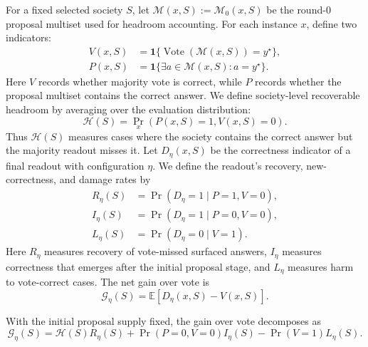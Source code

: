 \documentclass{article}
\begin{document}
For a fixed selected society $S$, let
$\mathcal M(x,S):=\mathcal M_0(x,S)$ be the round-0 proposal multiset used for
headroom accounting. For each instance $x$, define two indicators:
\begin{equation}
\begin{aligned}
    V(x,S)&=\mathbf 1\{\operatorname{Vote}(\mathcal M(x,S))=y^\star\},\\
    P(x,S)&=\mathbf 1\{\exists a\in\mathcal M(x,S):a=y^\star\}.
\end{aligned}
    \label{eq:vote_proposal_hit}
\end{equation}
Here $V$ records whether majority vote is correct, while $P$ records whether
the proposal multiset contains the correct answer. We define society-level
recoverable headroom by averaging over the evaluation distribution:
\begin{equation}
    \mathcal H(S)=\Pr_x(P(x,S)=1,V(x,S)=0).
    \label{eq:headroom}
\end{equation}
Thus $\mathcal H(S)$ measures cases where the society contains the correct
answer but the majority readout misses it.
Let $D_\eta(x,S)$ be the correctness indicator of a final readout with
configuration $\eta$. We define the readout's recovery, new-correctness, and
damage rates by
\begin{equation}
\begin{aligned}
    R_\eta(S)&=\Pr(D_\eta=1\mid P=1,V=0),\\
    I_\eta(S)&=\Pr(D_\eta=1\mid P=0,V=0),\\
    L_\eta(S)&=\Pr(D_\eta=0\mid V=1).
\end{aligned}
    \label{eq:recovery_damage}
\end{equation}
Here $R_\eta$ measures recovery of vote-missed surfaced answers, $I_\eta$
measures correctness that emerges after the initial proposal stage, and
$L_\eta$ measures harm to vote-correct cases. The net gain over vote is
\begin{equation}
    \mathcal G_\eta(S)=\mathbb E[D_\eta(x,S)-V(x,S)].
    \label{eq:gain_def}
\end{equation}
\begin{proposition}
\label{prop:recovery_damage_decomposition}
With the initial proposal supply fixed, the gain over vote decomposes as
\begin{equation}
    \mathcal G_\eta(S)
    =
    \mathcal H(S)R_\eta(S)
    +
    \Pr(P=0,V=0)I_\eta(S)
    -
    \Pr(V=1)L_\eta(S).
    \label{eq:headroom_decomposition}
\end{equation}
\end{proposition}
\end{document}
